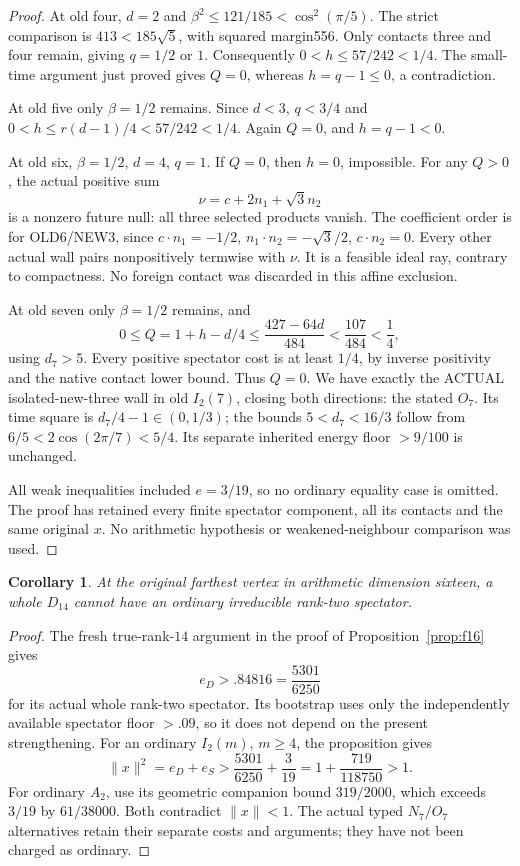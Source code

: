 \documentclass[11pt]{article}
\newtheorem{corollary}[theorem]{Corollary}
\begin{document}
\begin{proof}
At old four, \(d=2\) and
\(\beta^2\le121/185<\cos^2(\pi/5)\).
The strict comparison is \(413<185\sqrt5\), with squared
margin556.  Only contacts three and four remain, giving
\(q=1/2\) or \(1\).
Consequently \(0<h\le57/242<1/4\).
The small-time argument just proved gives \(Q=0\), whereas
\(h=q-1\le0\), a contradiction.

At old five only \(\beta=1/2\) remains.
Since \(d<3\), \(q<3/4\) and
\(0<h\le r(d-1)/4<57/242<1/4\).
Again \(Q=0\), and \(h=q-1<0\).

At old six, \(\beta=1/2\), \(d=4\), \(q=1\).
If \(Q=0\), then \(h=0\), impossible.
For any \(Q>0\), the actual positive sum
\[
                          \nu=c+2n_1+\sqrt3n_2
\]
is a nonzero future null: all three selected products vanish.
The coefficient order is for OLD6/NEW3, since
\(c\cdot n_1=-1/2\), \(n_1\cdot n_2=-\sqrt3/2\),
\(c\cdot n_2=0\).
Every other actual wall pairs nonpositively termwise with \(\nu\).
It is a feasible ideal ray, contrary to compactness.
No foreign contact was discarded in this affine exclusion.

At old seven only \(\beta=1/2\) remains, and
\[
 0\le Q=1+h-d/4
 \le{\frac{427-64d}{484}}<{\frac{107}{484}}<{\frac{1}{4}},
\]
using \(d_7>5\).
Every positive spectator cost is at least \(1/4\), by inverse
positivity and the native contact lower bound.  Thus \(Q=0\).
We have exactly the ACTUAL isolated-new-three wall in old
\(I_2(7)\), closing both directions: the stated \(O_7\).
Its time square is \(d_7/4-1\in(0,1/3)\);
the bounds \(5<d_7<16/3\) follow from
\(6/5<2\cos(2\pi/7)<5/4\).
Its separate inherited energy floor \(>9/100\) is unchanged.

All weak inequalities included \(e=3/19\), so no ordinary equality
case is omitted.  The proof has retained every finite spectator
component, all its contacts and the same original \(x\).
No arithmetic hypothesis or weakened-neighbour comparison was used.
\end{proof}

\begin{corollary}\label{cor:D14ordinarydihedral}
At the original farthest vertex in arithmetic dimension sixteen,
a whole \(D_{14}\) cannot have an ordinary irreducible
rank-two spectator.
\end{corollary}
\begin{proof}
The fresh true-rank-\(14\) argument in the proof of
Proposition~\ref{prop:f16} gives
\[
                         e_D>.84816={\frac{5301}{6250}}
\]
for its actual whole rank-two spectator.
Its bootstrap uses only the independently available spectator
floor \(>.09\), so it does not depend on the present strengthening.
For an ordinary \(I_2(m)\), \(m\ge4\), the proposition gives
\[
 \|x\|^2=e_D+e_S>
 {\frac{5301}{6250}}+{\frac{3}{19}}
 =1+{\frac{719}{118750}}>1 .
\]
For ordinary \(A_2\), use its geometric companion bound
\(319/2000\), which exceeds \(3/19\) by \(61/38000\).
Both contradict \(\|x\|<1\).
The actual typed \(N_7/O_7\) alternatives retain their separate
costs and arguments; they have not been charged as ordinary.
\end{proof}
\end{document}
